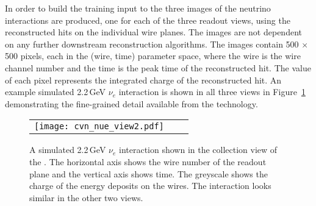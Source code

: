 In order to build the training input to the   three images of the neutrino interactions are produced, one for each of the three readout views, using the reconstructed hits on the individual wire planes. The images are not dependent on any further downstream reconstruction algorithms. The images contain 500 $\times$ 500 pixels, each in the (wire, time) parameter space, where the wire is the wire channel number and the time is the peak time of the reconstructed hit. 
The value of each pixel represents the integrated charge of the reconstructed hit. An example simulated 2.2\,GeV $\nu_{e}$  interaction is shown in all three views in Figure~\ref{fig:views} demonstrating the fine-grained detail available from the  technology.

\begin{figure}[htb] 
\centering
	\begin{tabular}{ccc}
		\texttt{[image: cvn\_nue\_view2.pdf]}
    \end{tabular}
\caption[A simulated \SI{2.2}{GeV} \nue CC interaction viewed by collection wires in the SP \lartpc]{A simulated 2.2\,GeV $\nu_{e}$  interaction shown in the collection view of the  . The horizontal axis shows the wire number of the readout plane and the vertical axis shows time. The greyscale shows the charge of the energy deposits on the wires. The interaction looks similar in the other two views.}
	\label{fig:views}
\end{figure}


